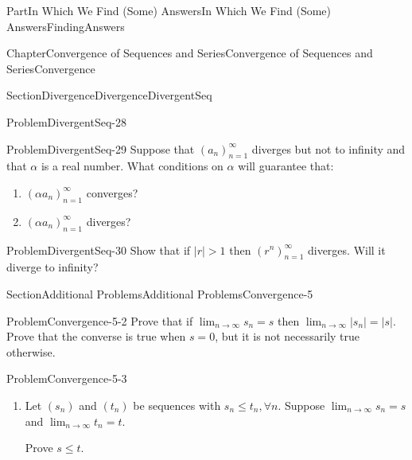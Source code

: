 \documentclass[oneside,10pt,]{book}
\numberwithin{equation}{part}
\newcommand{\abs}[1]{\left|#1\right|}
\newcommand{\NN}{\mathbb {N}}
\newcommand{\amp}{&}
\begin{document}
\begin{partptx}{Part}{In Which We Find (Some) Answers}{}{In Which We Find (Some) Answers}{}{}{FindingAnswers}
\begin{chapterptx}{Chapter}{Convergence of Sequences and Series}{}{Convergence of Sequences and Series}{}{}{Convergence}
\begin{sectionptx}{Section}{Divergence}{}{Divergence}{}{}{DivergentSeq}
\begin{problem}{Problem}{}{DivergentSeq-28}
%
\end{problem}
\begin{problem}{Problem}{}{DivergentSeq-29}%
Suppose that \(\left(a_n\right)_{n=1}^\infty\) diverges but not to infinity and that \(\alpha\) is a real number. What conditions on \(\alpha\) will guarantee that:%
\begin{enumerate}[font=\bfseries,label=(\alph*),ref=\alph*]%
\item{}\(\left(\alpha a_n\right)_{n=1}^\infty\) converges?%
\item{}\(\left(\alpha a_n\right)_{n=1}^\infty\) diverges?%
\end{enumerate}%
\end{problem}
\begin{problem}{Problem}{}{DivergentSeq-30}%
Show that if \(\abs{r}>1\) then \(\left(r^n\right)_{n=1}^\infty\) diverges.  Will it diverge to infinity?%
\end{problem}
\end{sectionptx}
%
%
\typeout{************************************************}
\typeout{************************************************}
%
\begin{sectionptx}{Section}{Additional Problems}{}{Additional Problems}{}{}{Convergence-5}
\begin{problem}{Problem}{}{Convergence-5-2}%
Prove that if \(\lim_{n\rightarrow\infty}s_n=s\) then \(\lim_{n\rightarrow\infty}|s_n|=|s|\).  Prove that the converse is true when \(s=0\), but it is not necessarily true otherwise.%
\end{problem}
\begin{problem}{Problem}{}{Convergence-5-3}%
\begin{enumerate}[font=\bfseries,label=(\alph*),ref=\alph*]%
\item{}Let \(\left(s_n\right)\) and \(\left(t_n\right)\) be sequences with \(s_n\leq t_n,\forall n\).  Suppose \(\lim_{n\rightarrow\infty}s_n=s\) and \(\lim_{n\rightarrow\infty}t_n=t\).%
\par
Prove \(s\leq t\).%
\par\smallskip%

\end{enumerate}
\end{problem}
\end{sectionptx}
\end{chapterptx}
\end{partptx}
\end{document}
